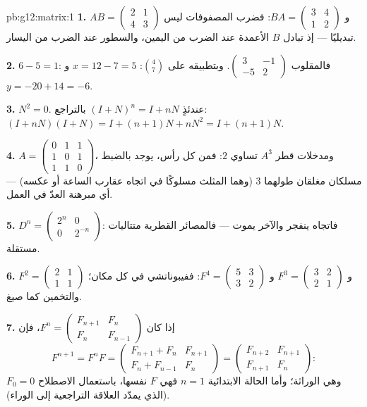 \begin{solution}{pb:g12:matrix:1}
\textbf{1.} $AB = \begin{pmatrix} 2 & 1\\ 4 & 3\end{pmatrix}$
و $BA = \begin{pmatrix} 3 & 4\\ 1 & 2\end{pmatrix}$: فضرب المصفوفات
ليس تبديليًا --- إذ تبادل $B$ الأعمدة عند الضرب من
اليمين، والسطور عند الضرب من اليسار.

\textbf{2.}  $6 - 5 = 1$: فالمقلوب
$\begin{pmatrix} 3 & -1\\ -5 & 2\end{pmatrix}$. وبتطبيقه على
$\binom{4}{7}$: $x = 12 - 7 = 5$ و $y = -20 + 14 = -6$.

\textbf{3.} $N^2 = 0$. عندئذٍ $(I + N)^n = I + nN$ بالتراجع:
$(I + nN)(I + N) = I + (n+1)N + nN^2 = I + (n+1)N$.

\textbf{4.} $A = \begin{pmatrix} 0&1&1\\ 1&0&1\\ 1&1&0
\end{pmatrix}$، ومدخلات قطر $A^3$ تساوي $2$: فمن كل
رأس، يوجد بالضبط مسلكان مغلقان طولهما $3$ (وهما المثلث
مسلوكًا في اتجاه عقارب الساعة أو عكسه) --- أي مبرهنة العدّ
في العمل.

\textbf{5.} $D^n = \begin{pmatrix} 2^n & 0\\ 0 & 2^{-n}
\end{pmatrix}$: فاتجاه ينفجر والآخر يموت ---
فالمصائر القطرية متتاليات  مستقلة.

\textbf{6.} $F^2 = \begin{pmatrix} 2 & 1\\ 1 & 1\end{pmatrix}$ و
$F^3 = \begin{pmatrix} 3 & 2\\ 2 & 1\end{pmatrix}$ و
$F^4 = \begin{pmatrix} 5 & 3\\ 3 & 2\end{pmatrix}$: ففيبوناتشي
في كل مكان؛ والتخمين كما صيغ.

\textbf{7.} إذا كان $F^n = \begin{pmatrix} F_{n+1} & F_n\\ F_n &
F_{n-1}\end{pmatrix}$، فإن
\[
F^{n+1} = F^n F =
\begin{pmatrix} F_{n+1} + F_n & F_{n+1}\\
F_n + F_{n-1} & F_n \end{pmatrix}
= \begin{pmatrix} F_{n+2} & F_{n+1}\\ F_{n+1} & F_n
\end{pmatrix} :
\]
وهي الوراثة؛ وأما الحالة الابتدائية $n = 1$ فهي $F$ نفسها، باستعمال
الاصطلاح $F_0 = 0$ (الذي يمدّد العلاقة التراجعية إلى الوراء).


\end{solution}
